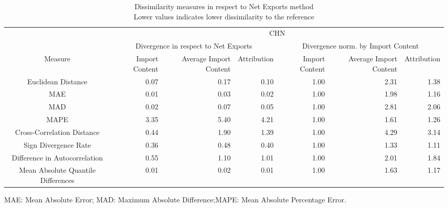 \begin{table}[t]
\caption*{
{\large Dissimilarity measures in respect to Net Exports method} \\ 
{\small Lower values indicates lower dissimilarity to the reference}
} 
\fontsize{15.0pt}{18.0pt}\selectfont
\begin{tabular*}{\linewidth}{@{\extracolsep{\fill}}crrrrrr}
\toprule
 & \multicolumn{6}{c}{CHN} \\ 
\cmidrule(lr){2-7}
 & \multicolumn{3}{c}{Divergence in respect to Net Exports} & \multicolumn{3}{c}{Divergence norm. by Import Content} \\ 
\cmidrule(lr){2-4} \cmidrule(lr){5-7}
Measure & Import Content & Average Import Content & Attribution & Import Content & Average Import Content & Attribution \\ 
\midrule\addlinespace[2.5pt]
Euclidean Distance & 0.07 & 0.17 & 0.10 & 1.00 & 2.31 & 1.38 \\ 
MAE & 0.01 & 0.03 & 0.02 & 1.00 & 1.98 & 1.16 \\ 
MAD & 0.02 & 0.07 & 0.05 & 1.00 & 2.81 & 2.06 \\ 
MAPE & 3.35 & 5.40 & 4.21 & 1.00 & 1.61 & 1.26 \\ 
Cross-Correlation Distance & 0.44 & 1.90 & 1.39 & 1.00 & 4.29 & 3.14 \\ 
Sign Divergence Rate & 0.36 & 0.48 & 0.40 & 1.00 & 1.33 & 1.11 \\ 
Difference in Autocorrelation & 0.55 & 1.10 & 1.01 & 1.00 & 2.01 & 1.84 \\ 
Mean Absolute Quantile Differences & 0.01 & 0.02 & 0.01 & 1.00 & 1.63 & 1.17 \\ 
\bottomrule
\end{tabular*}
\begin{minipage}{\linewidth}
MAE: Mean Absolute Error; MAD: Maximum Absolute Difference;MAPE: Mean Absolute Percentage Error.\\
\end{minipage}
\end{table}

